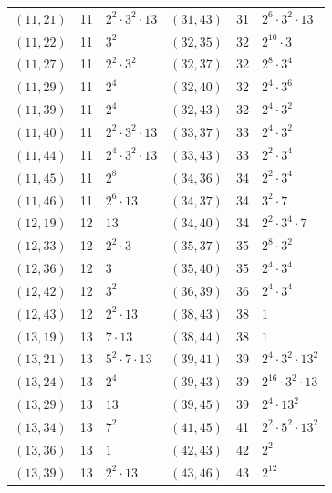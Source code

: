 \documentclass[11pt]{article}
\begin{document}
\begin{longtable}{@{}lrl@{\qquad}lrl@{}}
$(11,21)$ & 11 & $2^{2}\cdot 3^{2}\cdot 13$ & $(31,43)$ & 31 & $2^{6}\cdot 3^{2}\cdot 13$\\
$(11,22)$ & 11 & $3^{2}$ & $(32,35)$ & 32 & $2^{10}\cdot 3$\\
$(11,27)$ & 11 & $2^{2}\cdot 3^{2}$ & $(32,37)$ & 32 & $2^{8}\cdot 3^{4}$\\
$(11,29)$ & 11 & $2^{4}$ & $(32,40)$ & 32 & $2^{4}\cdot 3^{6}$\\
$(11,39)$ & 11 & $2^{4}$ & $(32,43)$ & 32 & $2^{4}\cdot 3^{2}$\\
$(11,40)$ & 11 & $2^{2}\cdot 3^{2}\cdot 13$ & $(33,37)$ & 33 & $2^{4}\cdot 3^{2}$\\
$(11,44)$ & 11 & $2^{4}\cdot 3^{2}\cdot 13$ & $(33,43)$ & 33 & $2^{2}\cdot 3^{4}$\\
$(11,45)$ & 11 & $2^{8}$ & $(34,36)$ & 34 & $2^{2}\cdot 3^{4}$\\
$(11,46)$ & 11 & $2^{6}\cdot 13$ & $(34,37)$ & 34 & $3^{2}\cdot 7$\\
$(12,19)$ & 12 & $13$ & $(34,40)$ & 34 & $2^{2}\cdot 3^{4}\cdot 7$\\
$(12,33)$ & 12 & $2^{2}\cdot 3$ & $(35,37)$ & 35 & $2^{8}\cdot 3^{2}$\\
$(12,36)$ & 12 & $3$ & $(35,40)$ & 35 & $2^{4}\cdot 3^{4}$\\
$(12,42)$ & 12 & $3^{2}$ & $(36,39)$ & 36 & $2^{4}\cdot 3^{4}$\\
$(12,43)$ & 12 & $2^{2}\cdot 13$ & $(38,43)$ & 38 & $1$\\
$(13,19)$ & 13 & $7\cdot 13$ & $(38,44)$ & 38 & $1$\\
$(13,21)$ & 13 & $5^{2}\cdot 7\cdot 13$ & $(39,41)$ & 39 & $2^{4}\cdot 3^{2}\cdot 13^{2}$\\
$(13,24)$ & 13 & $2^{4}$ & $(39,43)$ & 39 & $2^{16}\cdot 3^{2}\cdot 13$\\
$(13,29)$ & 13 & $13$ & $(39,45)$ & 39 & $2^{4}\cdot 13^{2}$\\
$(13,34)$ & 13 & $7^{2}$ & $(41,45)$ & 41 & $2^{2}\cdot 5^{2}\cdot 13^{2}$\\
$(13,36)$ & 13 & $1$ & $(42,43)$ & 42 & $2^{2}$\\
$(13,39)$ & 13 & $2^{2}\cdot 13$ & $(43,46)$ & 43 & $2^{12}$\\
\end{longtable}
\endgroup
\end{document}
